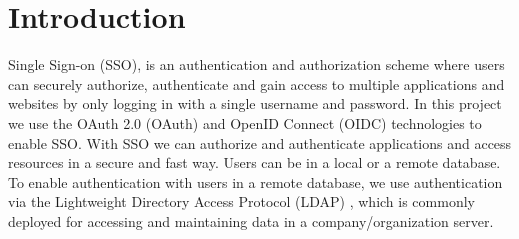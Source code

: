 \section{Introduction}

Single Sign-on (SSO), is an authentication and authorization scheme where users can securely authorize, authenticate and gain access to multiple applications and websites by only logging in with a single username and password. In this project we use the OAuth 2.0 (OAuth) \cite{OAUTH} and OpenID Connect (OIDC) \cite{OIDC} technologies to enable SSO. With SSO we can authorize and authenticate applications and access resources in a secure and fast way. Users can be in a local or a remote database. To enable authentication with users in a remote database, we use authentication via the Lightweight Directory Access Protocol (LDAP) \cite{LDAP}, which is commonly deployed for accessing and maintaining data in a company/organization server.
